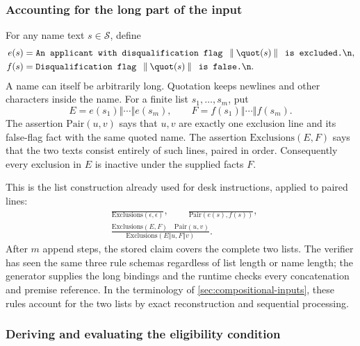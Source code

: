 \documentclass[11pt,twoside]{article}
\theoremstyle{definition}
\newcommand{\Stext}{\mathcal S}
\newcommand{\cat}{\mathbin{\Vert}}
\begin{document}
\subsubsection{Accounting for the long part of the input}

For any name text $s\in\Stext$, define
\begin{align*}
e(s)&=\text{\ttfamily An applicant with disqualification flag }\cat\quot(s)
       \cat\text{\ttfamily\ is excluded.\textbackslash n},\\
f(s)&=\text{\ttfamily Disqualification flag }\cat\quot(s)
       \cat\text{\ttfamily\ is false.\textbackslash n}.
\end{align*}
A name can itself be arbitrarily long. Quotation keeps newlines and other
characters inside the name. For a finite list $s_1,\ldots,s_m$, put
\begin{equation}
 E=e(s_1)\cat\cdots\cat e(s_m),\qquad
 F=f(s_1)\cat\cdots\cat f(s_m).
\label{eq:ef}
\end{equation}
The assertion $\mathrm{Pair}(u,v)$ says that $u,v$ are exactly one exclusion
line and its false-flag fact with the same quoted name. The assertion
$\mathrm{Exclusions}(E,F)$ says that the two texts consist entirely of such
lines, paired in order. Consequently every exclusion in $E$ is inactive
under the supplied facts $F$.

This is the list construction already used for desk instructions, applied
to paired lines:
\begin{align}
&\frac{}{\mathrm{Exclusions}(\epsilon,\epsilon)},\qquad
 \frac{}{\mathrm{Pair}(e(s),f(s))},\label{eq:tax-start}\\[3pt]
&\frac{\mathrm{Exclusions}(E,F)\quad \mathrm{Pair}(u,v)}
 {\mathrm{Exclusions}(E\cat u,F\cat v)}.
\label{eq:tax-append}
\end{align}
After $m$ append steps, the stored claim covers the complete two lists.
The verifier has seen the same three rule schemas regardless of list length
or name length; the generator supplies the long bindings and the runtime
checks every concatenation and premise reference.
In the terminology of \cref{sec:compositional-inputs}, these rules account for
the two lists by exact reconstruction and sequential processing.

\subsubsection{Deriving and evaluating the eligibility condition}
\end{document}
